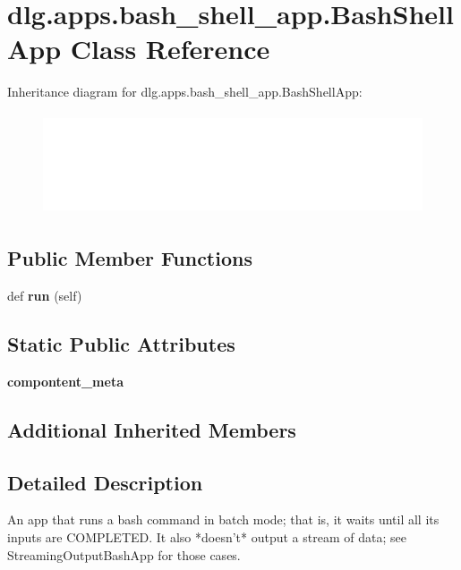 \hypertarget{classdlg_1_1apps_1_1bash__shell__app_1_1_bash_shell_app}{}\section{dlg.\+apps.\+bash\+\_\+shell\+\_\+app.\+Bash\+Shell\+App Class Reference}
\label{classdlg_1_1apps_1_1bash__shell__app_1_1_bash_shell_app}
Inheritance diagram for dlg.\+apps.\+bash\+\_\+shell\+\_\+app.\+Bash\+Shell\+App\+:\begin{figure}[H]
\begin{center}
\leavevmode
\includegraphics[height=3.000000cm]{classdlg_1_1apps_1_1bash__shell__app_1_1_bash_shell_app}
\end{center}
\end{figure}
\subsection*{Public Member Functions}
\begin{DoxyCompactItemize}
\item 
\mbox{\label{classdlg_1_1apps_1_1bash__shell__app_1_1_bash_shell_app_aaed2fe39385aeb2b60caa2ec724e67d0}} 
def {\bfseries run} (self)
\end{DoxyCompactItemize}
\subsection*{Static Public Attributes}
\begin{DoxyCompactItemize}
\item 
{\bfseries compontent\+\_\+meta}
\end{DoxyCompactItemize}
\subsection*{Additional Inherited Members}


\subsection{Detailed Description}
\begin{DoxyVerb}An app that runs a bash command in batch mode; that is, it waits until all
its inputs are COMPLETED. It also *doesn't* output a stream of data; see
StreamingOutputBashApp for those cases.
\end{DoxyVerb}
 

